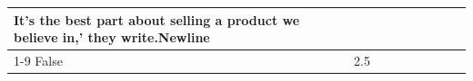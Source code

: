 \begin{table}[H]
{\begin{tabular}{lllrlllll}
It’s the best part about selling a product we believe in,' they write.Newline \\
\cline{1-9}
False & 2.5%

\end{tabular}}
\end{table}
